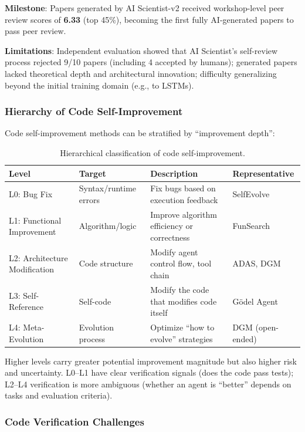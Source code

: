 \textbf{Milestone}: Papers generated by AI Scientist-v2 received workshop-level peer review scores of \textbf{6.33} (top 45\%), becoming the first fully AI-generated papers to pass peer review.

\textbf{Limitations}: Independent evaluation showed that AI Scientist's self-review process rejected 9/10 papers (including 4 accepted by humans); generated papers lacked theoretical depth and architectural innovation; difficulty generalizing beyond the initial training domain (e.g., to LSTMs).

\subsubsection{Hierarchy of Code Self-Improvement}

Code self-improvement methods can be stratified by ``improvement depth'':

\begin{table}[htbp]
\centering
\caption{Hierarchical classification of code self-improvement.}
\label{tab:code-evolve-levels}
\begin{tabular}{llp{50mm}l}
\toprule
\textbf{Level} & \textbf{Target} & \textbf{Description} & \textbf{Representative} \\
\midrule
L0: Bug Fix & Syntax/runtime errors & Fix bugs based on execution feedback & SelfEvolve \\
L1: Functional Improvement & Algorithm/logic & Improve algorithm efficiency or correctness & FunSearch \\
L2: Architecture Modification & Code structure & Modify agent control flow, tool chain & ADAS, DGM \\
L3: Self-Reference & Self-code & Modify the code that modifies code itself & G\"{o}del Agent \\
L4: Meta-Evolution & Evolution process & Optimize ``how to evolve'' strategies & DGM (open-ended) \\
\bottomrule
\end{tabular}
\end{table}

Higher levels carry greater potential improvement magnitude but also higher risk and uncertainty. L0--L1 have clear verification signals (does the code pass tests); L2--L4 verification is more ambiguous (whether an agent is ``better'' depends on tasks and evaluation criteria).

\subsubsection{Code Verification Challenges}

